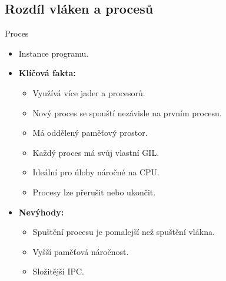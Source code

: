 \documentclass{beamer}
\begin{document}
\subsection{Rozdíl vláken a procesů}
\begin{frame}{Proces}
	\begin{itemize}
		\item Instance programu.
		\item \textbf{Klíčová fakta:}
			\begin{itemize}
				\item [\textendash] Využívá více jader a procesorů.
				\item [\textendash] Nový proces se spouští nezávisle na prvním procesu.
				\item [\textendash] Má oddělený paměťový prostor.
				\item [\textendash] Každý proces má svůj vlastní GIL.
				\item [\textendash] Ideální pro úlohy náročné na CPU.
				\item [\textendash] Procesy lze přerušit nebo ukončit.
			\end{itemize}
		\item \textbf{Nevýhody:}
			\begin{itemize}
				\item [\textendash] Spuštění procesu je pomalejší než spuštění vlákna.
				\item [\textendash] Vyšší paměťová náročnost.
				\item [\textendash] Složitější IPC.
			\end{itemize}
	\end{itemize}
\end{frame}
\end{document}
